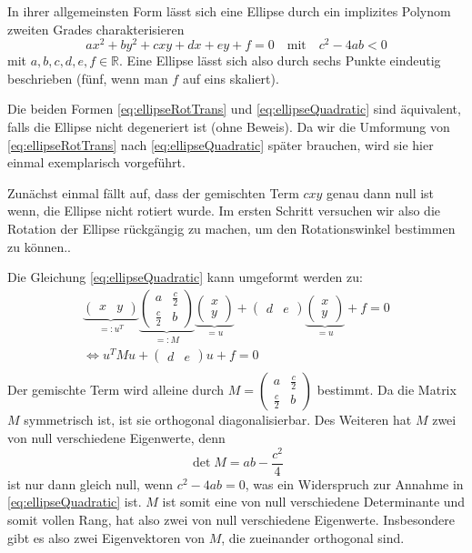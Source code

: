 In ihrer allgemeinsten Form lässt sich eine Ellipse durch ein implizites Polynom zweiten Grades charakterisieren
\begin{equation} \label{eq:ellipseQuadratic}
ax^2 + by^2 + cxy + dx + ey + f = 0 \quad \text{mit}\quad c^2-4ab < 0
\end{equation} 
mit $a,b,c,d,e,f \in \mathbb{R}$. Eine Ellipse lässt sich also durch sechs Punkte eindeutig beschrieben (fünf, wenn man $f$ auf eins skaliert).


Die beiden Formen \ref{eq:ellipseRotTrans} und \ref{eq:ellipseQuadratic} sind äquivalent, falls die Ellipse nicht degeneriert ist (ohne Beweis). Da wir die Umformung von \ref{eq:ellipseRotTrans} nach \ref{eq:ellipseQuadratic} später brauchen, wird sie hier einmal exemplarisch vorgeführt. 

Zunächst einmal fällt auf, dass der gemischten Term $cxy$ genau dann null ist wenn, die Ellipse nicht rotiert wurde. Im ersten Schritt versuchen wir also die Rotation der Ellipse rückgängig zu machen, um den Rotationswinkel bestimmen zu können..

Die Gleichung \ref{eq:ellipseQuadratic} kann umgeformt werden zu:
\begin{equation*}
\begin{aligned}
\underbrace{\begin{pmatrix}x & y\end{pmatrix}}_{=:u^T}\underbrace{\begin{pmatrix}a & \frac{c}{2} \\ \frac{c}{2} & b\end{pmatrix}}_{=: M}\underbrace{\begin{pmatrix}x \\ y\end{pmatrix}}_{=u} +\begin{pmatrix}d & e\end{pmatrix}\underbrace{\begin{pmatrix}x \\ y\end{pmatrix}}_{=u}+ f = 0 \\
\Leftrightarrow u^TMu +\begin{pmatrix}d & e\end{pmatrix}u + f = 0 \\
\end{aligned}
\end{equation*} 
Der gemischte Term wird alleine durch $M = \begin{pmatrix}a & \frac{c}{2} \\ \frac{c}{2} & b\end{pmatrix}$ bestimmt. Da die Matrix $M$ symmetrisch ist, ist sie orthogonal diagonalisierbar. Des Weiteren hat $M$ zwei von null verschiedene Eigenwerte, denn 
\[
\det M = ab - \dfrac{c^2}{4}
\] ist nur dann gleich null, wenn $c^2 - 4ab = 0$, was ein Widerspruch zur Annahme in \ref{eq:ellipseQuadratic} ist. $M$ ist somit eine von null verschiedene Determinante und somit vollen Rang, hat also zwei von null verschiedene Eigenwerte. Insbesondere gibt es also zwei Eigenvektoren von $M$, die zueinander orthogonal sind.

